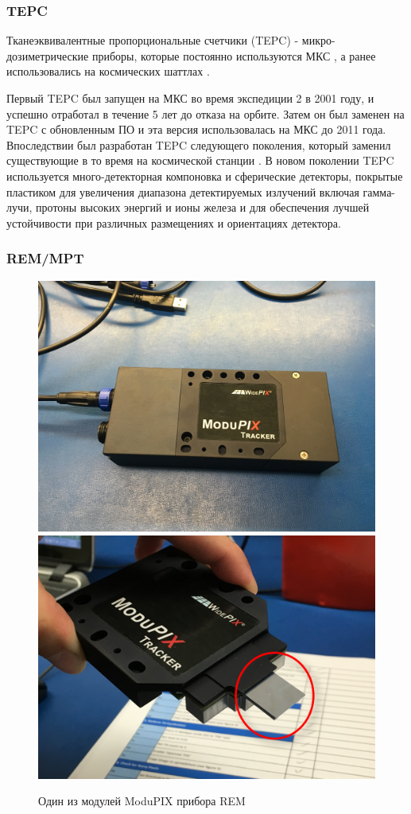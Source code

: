 \subsubsection{TEPC}

Тканеэквивалентные пропорциональные счетчики (TEPC) - микро-дозиметрические приборы, которые постоянно используются МКС \cite{Perez-Nunez2011}, а ранее использовались на космических шаттлах \cite{Badhwar2002}.


Первый TEPC был запущен на МКС во время экспедиции 2 в 2001 году, и успешно отработал в течение 5 лет до отказа на орбите. Затем он был заменен на TEPC с обновленным ПО и эта версия использовалась на МКС до 2011 года. Впоследствии был разработан TEPC следующего поколения, который заменил существующие в то время на космической станции \cite{Perez-Nunez2011}. В новом поколении TEPC используется много-детекторная компоновка и сферические детекторы, покрытые пластиком для увеличения диапазона детектируемых излучений включая гамма-лучи, протоны высоких энергий и ионы железа и для обеспечения лучшей устойчивости при различных размещениях и ориентациях детектора.

\subsubsection{REM/MPT}
\begin{figure}
	\centering
	\includegraphics[width=0.49\linewidth]{images/remmodupix}
	\includegraphics[width=0.49\linewidth]{images/modupix}
	\caption{Один из модулей ModuPIX прибора REM}
	\label{fig:modupix}
\end{figure}



